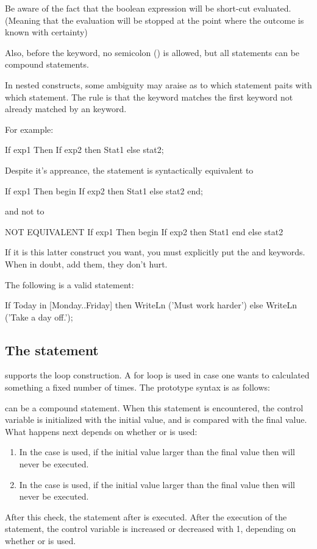 \documentclass{report}
\begin{document}
Be aware of the fact that the boolean expression will be short-cut evaluated. 
(Meaning that the evaluation will be stopped at the point where the
 outcome is known with certainty)

Also, before the  keyword,  no semicolon (\var{;}) is allowed,
but all statements can be compound statements.

In nested  constructs, some ambiguity may araise as
to which   statement paits with which  statement. The rule
is that the  keyword matches the first  keyword not
already matched by an  keyword.

For example:
\begin{listing}
If exp1 Then 
  If exp2 then 
    Stat1 
else 
  stat2;
\end{listing}
Despite it's appreance, the statement is syntactically equivalent to
\begin{listing}
If exp1 Then
   begin 
   If exp2 then 
      Stat1 
   else 
      stat2
   end;
\end{listing}
and not to 
\begin{listing}
{ NOT EQUIVALENT }
If exp1 Then
   begin 
   If exp2 then 
      Stat1 
   end
else 
   stat2
\end{listing}
If it is this latter construct you want, you must explicitly put the
 and  keywords. When in doubt, add them, they don't
hurt.

The following is a valid statement:
\begin{listing}
If Today in [Monday..Friday] then
  WriteLn ('Must work harder')
else
  WriteLn ('Take a day off.');
\end{listing}

\subsection{The  statement}

\fpc supports the  loop construction. A for loop is used in case
one wants to calculated something a fixed number of times. 
The prototype syntax is as follows:



 can be a compound statement. 
When this statement is encountered, the control variable is initialized with
the initial value, and is compared with the final value.
What happens next depends on whether  or  is used:
\begin{enumerate}
\item In the case  is used, if the initial value larger than the final 
value then  will never be executed. 
\item In the case  is used, if the initial value larger than the final 
value then  will never be executed. 
\end{enumerate}
After this check, the statement after  is executed. After the
execution of the statement, the control variable is increased or decreased
with 1, depending on whether  or  is used.
\end{document}
